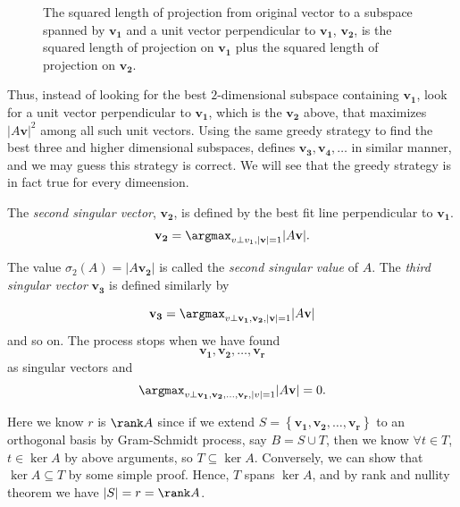 \begin{figure}[H]
  \centering
  \caption{The squared length of projection from original vector to a subspace spanned by \(\mathbf{v_1} \) and a unit vector perpendicular to \(\mathbf{v_1} \),  \(\mathbf{v_2} \), is the squared length of projection on \(\mathbf{v_1} \) plus the squared length of projection on \(\mathbf{v_2} \).  }
  \label{fig:proj2dim}
\end{figure}

Thus, instead of looking for the best \(2\)-dimensional subspace containing \(\mathbf{v_1} \), look for a unit vector perpendicular to \(\mathbf{v_1} \), which is the \(\mathbf{v_2} \) above, that maximizes \(\vert A \mathbf{v}  \vert^2 \) among all such unit vectors. Using the same greedy strategy to find the best three and higher dimensional subspaces, defines \(\mathbf{v_3}, \mathbf{v_4}, \dots  \) in similar manner, and we may guess this strategy is correct. We will see that the greedy strategy is in fact true for every dimeension. 

The \textit{second singular vector}, \(\mathbf{v_2} \), is defined by the best fit line perpendicular to \(\mathbf{v_1} \). 
\[
  \mathbf{v_2} = \argmax_{ v \perp v_1 , \vert \mathbf{v}  \vert = 1  } \vert A \mathbf{v}  \vert   .
\]  

The value \(\sigma _2(A)=\vert A \mathbf{v_2}  \vert \) is called the \textit{second singular value} of \(A\). The \textit{third singular vector} \(\mathbf{v_3}  \) is defined similarly by

\[
  \mathbf{v_3} = \argmax_{v \perp \mathbf{v_1}, \mathbf{v_2}, \vert \mathbf{v}  \vert=1  }\vert A \mathbf{v}  \vert  
\]
and so on. The process stops when we have found 
\[
  \mathbf{v_1}, \mathbf{v_2}, \dots , \mathbf{v_r}   
\]
as singular vectors and
\[
  \argmax_{v \perp \mathbf{v_1}, \mathbf{v_2}, \dots , \mathbf{v_r}  , \vert v \vert=1 }  \vert A \mathbf{v}  \vert = 0 .
\]

\begin{note}
  Here we know \(r\) is \(\rank A\) since if we extend \(S=\left\{ \mathbf{v_1}, \mathbf{v_2}, \dots , \mathbf{v_r}    \right\} \) to an orthogonal basis by Gram-Schmidt process, say \(B=S \cup T\), then we know \(\forall t \in T\), \(t \in \ker A\) by above arguments, so \(T \subseteq \ker A\). Conversely, we can show that \(\ker A \subseteq T\) by some simple proof. Hence, \(T\) spans \(\ker A\), and by rank and nullity theorem we have \(\vert S \vert = r =\rank A\).       
\end{note}

